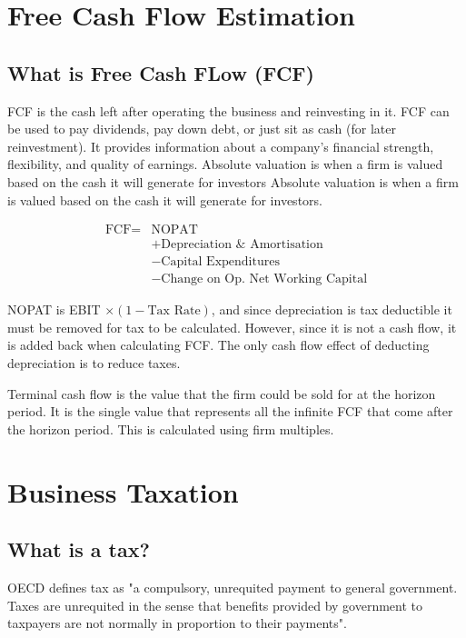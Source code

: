 \documentclass{article}
\begin{document}
\section{Free Cash Flow Estimation}

	\subsection{What is Free Cash FLow (FCF)}
		
		FCF is the cash left after operating the business and reinvesting in it. FCF can be used to pay dividends, pay down debt, or just sit as cash (for later reinvestment). It provides information about a company's financial strength, flexibility, and quality of earnings. Absolute valuation is when a firm is valued based on the cash it will generate for investors Absolute valuation is when a firm is valued based on the cash it will generate for investors.

		\begin{align*}
			\text{FCF} =& \text{NOPAT}	\\
						&+ \text{Depreciation & Amortisation}	\\
						&- \text{Capital Expenditures}	\\
						&- \text{Change on Op. Net Working Capital}
		\end{align*}

		NOPAT is EBIT $\times (1 - \text{Tax Rate})$, and since depreciation is tax deductible it must be removed for tax to be calculated. However, since it is not a cash flow, it is added back when calculating FCF. The only cash flow effect of deducting depreciation is to reduce taxes.

		Terminal cash flow is the value that the firm could be sold for at the horizon period. It is the single value that represents all the infinite FCF that come after the horizon period. This is calculated using firm multiples.

\section{Business Taxation}
	
	\subsection{What is a tax?}
		
		OECD defines tax as "a compulsory, unrequited payment to general government. Taxes are unrequited in the sense that benefits provided by government to taxpayers are not normally in proportion to their payments".
\end{document}
